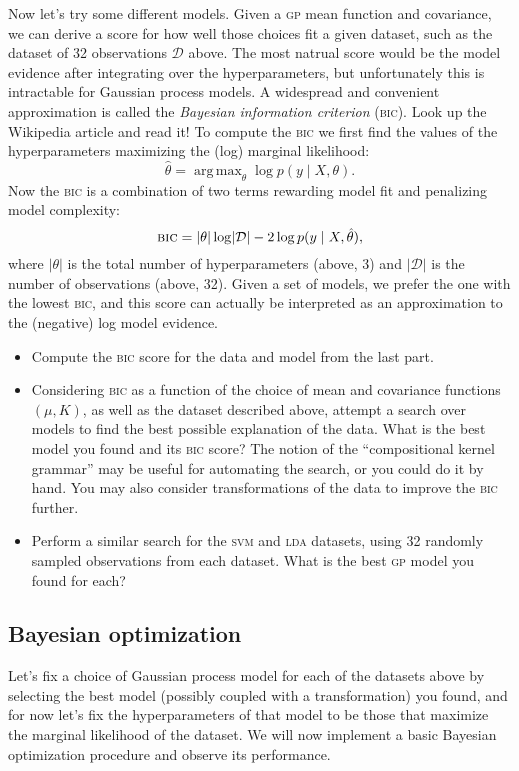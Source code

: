 \documentclass{article}
\newcommand{\acro}[1]{\textsc{\MakeLowercase{#1}}}
\newcommand{\given}{\mid}
\newcommand{\mc}[1]{\mathcal{#1}}
\newcommand{\data}{\mc{D}}
\DeclareMathOperator*{\argmax}{arg\,max}
\begin{document}
Now let's try some different models. Given a \acro{GP} mean function and
covariance, we can derive a score for how well those choices fit a given
dataset, such as the dataset of 32 observations $\data$ above. The most natrual
score would be the model evidence after integrating over the hyperparameters,
but unfortunately this is intractable for Gaussian process models. A widespread
and convenient approximation is called the \emph{Bayesian information criterion}
(\acro{BIC}). Look up the Wikipedia article and read it! To compute the
\acro{BIC} we first find the values of the hyperparameters maximizing the (log)
marginal likelihood:
\[
  \hat{\theta} = \argmax_\theta \log p(y \given X, \theta).
\]
Now the \acro{BIC} is a combination of two terms rewarding model fit and
penalizing model complexity:
\[
\acro{BIC} = \lvert \theta \rvert \log \lvert \data \rvert - 2 \log p(y \given X, \hat{\theta}),
\]
where $\lvert \theta \rvert$ is the total number of hyperparameters (above, 3)
and $\lvert \data \rvert$ is the number of observations (above, 32). Given a set
of models, we prefer the one with the lowest \acro{BIC}, and this score can actually
be interpreted as an approximation to the (negative) log model evidence.

\begin{itemize}
\item
  Compute the \acro{BIC} score for the data and model from the last part.
\item
  Considering \acro{BIC} as a function of the choice of mean and covariance
  functions $(\mu, K)$, as well as the dataset described above, attempt a search
  over models to find the best possible explanation of the data. What is the
  best model you found and its \acro{BIC} score? The notion of the
  ``compositional kernel grammar'' may be useful for automating the search, or
  you could do it by hand.  You may also consider transformations of the data to
  improve the \acro{BIC} further.
\item
  Perform a similar search for the \acro{SVM} and \acro{LDA} datasets, using 32
  randomly sampled observations from each dataset.  What is the best \acro{GP}
  model you found for each?
\end{itemize}

\subsection*{Bayesian optimization}

Let's fix a choice of Gaussian process model for each of the datasets above by
selecting the best model (possibly coupled with a transformation) you found, and
for now let's fix the hyperparameters of that model to be those that maximize
the marginal likelihood of the dataset. We will now implement a basic Bayesian
optimization procedure and observe its performance.
\end{document}
